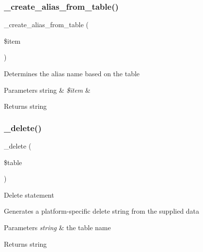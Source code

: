 \subsubsection{\texorpdfstring{\+\_\+create\+\_\+alias\+\_\+from\+\_\+table()}{\_create\_alias\_from\_table()}}
{\footnotesize\ttfamily \+\_\+create\+\_\+alias\+\_\+from\+\_\+table (\begin{DoxyParamCaption}\item[{}]{\$item }\end{DoxyParamCaption})\hspace{0.3cm}{\ttfamily [protected]}}

Determines the alias name based on the table


\begin{DoxyParams}[1]{Parameters}
string & {\em \$item} & \\
\hline
\end{DoxyParams}
\begin{DoxyReturn}{Returns}
string 
\end{DoxyReturn}
\mbox{\label{class_c_i___d_b__query__builder_a133ea8446ded52589bd22cc9163d0896}} 
\subsubsection{\texorpdfstring{\+\_\+delete()}{\_delete()}}
{\footnotesize\ttfamily \+\_\+delete (\begin{DoxyParamCaption}\item[{}]{\$table }\end{DoxyParamCaption})\hspace{0.3cm}{\ttfamily [protected]}}

Delete statement

Generates a platform-\/specific delete string from the supplied data


\begin{DoxyParams}{Parameters}
{\em string} & the table name \\
\hline
\end{DoxyParams}
\begin{DoxyReturn}{Returns}
string 
\end{DoxyReturn}
\mbox{\label{class_c_i___d_b__query__builder_aef43f7e3e7b71d337ff3724c5eb14f10}} 
